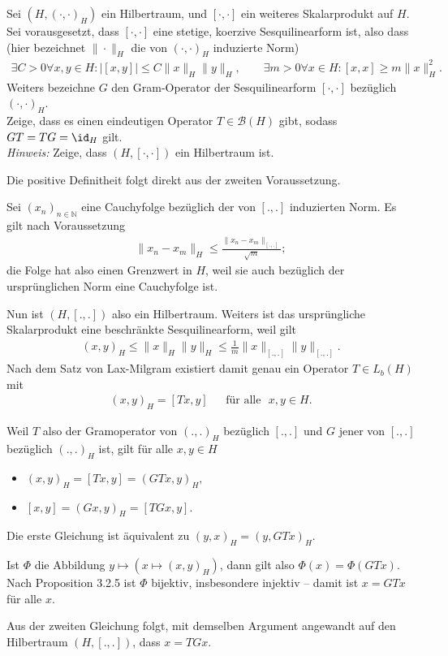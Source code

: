\begin{exercise}
Sei $(H,(\cdot,\cdot)_H)$ ein Hilbertraum, und $[\cdot,\cdot]$ ein weiteres Skalarprodukt
auf $H$. Sei vorausgesetzt, dass $[\cdot,\cdot]$ eine stetige, koerzive Sesquilinearform
ist, also dass (hier bezeichnet $\|\cdot\|_H$ die von $(\cdot,\cdot)_H$ induzierte Norm)
\begin{align*}
  \exists C > 0 \forall x,y \in H: |[x,y]| \leq C\|x\|_H\|y\|_H, \qquad
  \exists m > 0 \forall x \in H: [x,x] \geq m\|x\|_H^2.
\end{align*}
Weiters bezeichne $G$ den Gram-Operator der Sesquilinearform $[\cdot,\cdot]$
bezüglich $(\cdot,\cdot)_H$. \\
Zeige, dass es einen eindeutigen Operator $T \in \mathcal{B}(H)$ gibt, sodass
$GT = TG = \id_H $ gilt. \\
\textit{Hinweis:} Zeige, dass $(H,[\cdot,\cdot])$ ein Hilbertraum ist.
\end{exercise}
\begin{solution}
  Die positive Definitheit folgt direkt aus der zweiten Voraussetzung.

  Sei $(x_n)_{n \in \mathbb{N}}$ eine Cauchyfolge bezüglich der von $[.,.]$ induzierten Norm. Es gilt nach Voraussetzung
  \begin{align}
      \|x_n - x_m\|_H \leq \frac{\|x_n - x_m\|_{[.,.]}}{\sqrt{m}};
  \end{align}
  die Folge hat also einen Grenzwert in $H$, weil sie auch bezüglich der ursprünglichen Norm eine Cauchyfolge ist.

  Nun ist $(H, [.,.])$ also ein Hilbertraum. Weiters ist das ursprüngliche Skalarprodukt eine beschränkte Sesquilinearform,
  weil gilt
\begin{align}
    (x, y)_H \leq \|x\|_H \|y\|_H \leq \frac{1}{m} \|x\|_{[.,.]} \|y\|_{[.,.]}.
\end{align}
Nach dem Satz von Lax-Milgram existiert damit genau ein Operator $T \in L_b(H)$ mit
  \begin{align}
      (x, y)_H = [Tx, y] ~~~~~~~ \text{für alle~~} x, y \in H.
  \end{align}

  Weil $T$ also der Gramoperator von $(.,.)_H$ bezüglich $[.,.]$ und $G$ jener von $[.,.]$ bezüglich $(.,.)_H$ ist, gilt für alle $x, y \in H$

  \begin{itemize}
      \item $(x, y)_H = [Tx, y] = (GTx, y)_H,$
      \item $[x, y] = (Gx, y)_H = [TGx, y].$
  \end{itemize}

  Die erste Gleichung ist äquivalent zu $(y, x)_H = (y, GTx)_H.$

  Ist $\Phi$ die Abbildung $y \mapsto (x \mapsto (x, y)_H)$, dann gilt also $\Phi(x) = \Phi(GTx)$. Nach Proposition 3.2.5 ist $\Phi$ bijektiv, insbesondere injektiv -- damit ist $x = GTx$ für alle $x$.

  Aus der zweiten Gleichung folgt, mit demselben Argument angewandt auf den Hilbertraum $(H, [.,.])$, dass $x = TGx.$
\end{solution}
